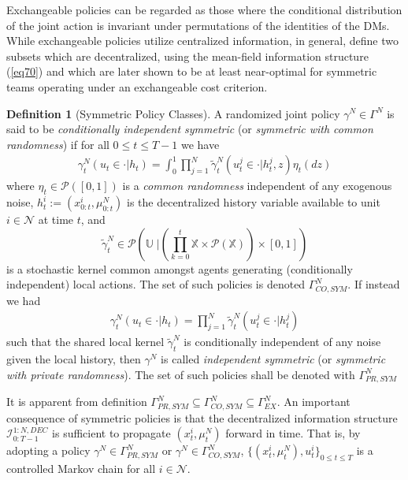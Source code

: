 \documentclass[12pt, oneside]{report}
\newcommand{\mbb}[1]{\mathbb{#1}}
\newcommand{\1}[1]{\mathbbm{1}_{\{#1\}}}
\newcommand{\mc}[1]{\mathcal{#1}}
\theoremstyle{definition}
\newtheorem{definition}[theorem]{Definition}
\begin{document}
Exchangeable policies can be regarded as those where the conditional distribution of the joint action
is invariant under permutations of the identities of the DMs. While exchangeable policies utilize centralized information,
in general, \cite{Sanjari_Saldi_Yüksel_2024} define two subsets which are decentralized, using the mean-field information structure
(\ref{eq70}) and which are later shown to be at least near-optimal for symmetric teams operating under an exchangeable cost criterion.
\begin{definition}[Symmetric Policy Classes]\label{def31}
    A randomized joint policy $\gamma^N\in\Gamma^N$ is said to be \textit{conditionally independent symmetric} (or \textit{symmetric with common randomness}) if for all $0\leq t\leq T-1$ we have
    \begin{align}
        \gamma^N_t(u_t\in \cdot|h_t)=\int_0^1\prod_{j=1}^N\widetilde{\gamma}_t^N(u^j_t\in \cdot|h^j_t,z)\eta_t(dz)\label{eq76}
    \end{align}
    where $\eta_t\in\mc{P}([0,1])$ is a \textit{common randomness} independent of any exogenous noise, $h^i_t:=(x^i_{0:t},\mu^N_{0:t})$ is the decentralized
    history variable available to unit $i\in\mc{N}$ at time $t$, and
    \[\widetilde{\gamma}^N_t\in\mc{P}\left(\mbb{U}\;\bigg|\left(\prod_{k=0}^t\mbb{X}\times\mc{P}(\mbb{X})\right)\times[0,1]\right)\]
    is a stochastic kernel common amongst agents generating (conditionally independent) local actions. The set of such policies is denoted $\Gamma^N_{\mathit{CO},\mathit{SYM}}$.
    If instead we had
    \begin{align}
        \gamma^N_t(u_t\in\cdot|h_t)=\prod_{j=1}^N\widetilde{\gamma}^N_t(u^j_t\in\cdot|h^j_t)\label{eq77}
    \end{align}
    such that the shared local kernel $\widetilde{\gamma}^N_t$ is conditionally independent of any noise given the local history, then $\gamma^N$ is called \textit{independent symmetric} (or
    \textit{symmetric with private randomness}). The set of such policies shall be denoted with $\Gamma^N_{PR,\mathit{SYM}}$
\end{definition}
It is apparent from definition $\Gamma^N_{PR,\mathit{SYM}}\subseteq\Gamma^N_{CO,\mathit{SYM}}\subseteq\Gamma^N_{EX}$. An important consequence of symmetric policies is that the decentralized information structure $\mc{I}^{1:N,\mathit{DEC}}_{0:T-1}$
is sufficient to propagate $(x^i_t,\mu^N_t)$ forward in time. That is, by adopting a policy $\gamma^N\in\Gamma^N_{PR,\mathit{SYM}}$ or $\gamma^N\in\Gamma^N_{CO,\mathit{SYM}}$, $\{(x^i_t,\mu^N_t),u^i_t\}_{0\leq t\leq T}$ is a controlled Markov chain for all $i\in\mc{N}$.
\end{document}

